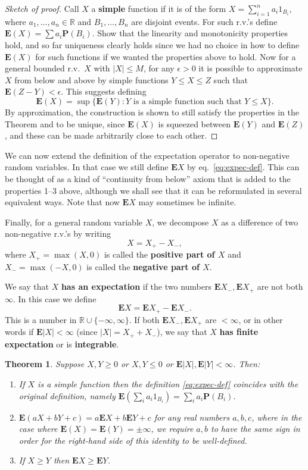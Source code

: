 \documentclass[12pt]{article}
\newtheorem{thm}{Theorem}[section]
\newcommand{\R}{\mathbb{R}}
\newcommand{\prob}{\mathbf{P}}
\newcommand{\expec}{\mathbf{E}}
\theoremstyle{example}
\begin{document}
\begin{proof}[Sketch of proof] Call $X$ a \textbf{simple} function if it is of the form $X=\sum_{i=1}^n a_i 1_{B_i}$, where $a_1,\ldots,a_n\in \R$ and $B_1,\ldots,B_n$ are disjoint events. For such r.v.'s define $\expec(X)=\sum a_i \prob(B_i)$. Show that the linearity and monotonicity properties hold, and so far uniqueness clearly holds since we had no choice in how to define $\expec(X)$ for such functions if we wanted the properties above to hold. Now for a general bounded r.v.\ $X$ with $|X|\le M$, for any $\epsilon>0$ it is possible to approximate $X$ from below and above by simple functions $Y \le X \le Z$ such that $\expec(Z-Y) < \epsilon$. This suggests defining
\begin{equation} \label{eq:expec-def}
\expec(X) = \sup \{ \expec(Y) : Y\textrm{ is a simple function such that }Y \le X \}.
\end{equation}
By approximation, the construction is shown to still satisfy the properties in the Theorem and to be unique, since $\expec(X)$ is squeezed between $\expec(Y)$ and $\expec(Z)$, and these can be made arbitrarily close to each other.
\end{proof}

We can now extend the definition of the expectation operator to non-negative random variables. In that case we still define $\expec X$ by eq.~\eqref{eq:expec-def}. This can be thought of as a kind of ``continuity from below'' axiom that is added to the properties 1--3 above, although we shall see that it can be reformulated in several equivalent ways. Note that now $\expec X$ may sometimes be infinite.

Finally, for a general random variable $X$, we decompose $X$ as a difference of two non-negative r.v.'s by writing
$$ X = X_+ - X_-, $$
where $X_+ = \max(X,0)$ is called the \textbf{positive part of $X$} and $X_-=\max(-X,0)$ is called the \textbf{negative part of $X$}.

We say that $X$ \textbf{has an expectation} if the two numbers $\expec X_-, \expec X_+$ are not both $\infty$. In this case we define
$$ \expec X = \expec X_+ - \expec X_-. $$
This is a number in $\R\cup\{ -\infty,\infty\}$. If both $\expec X_-, \expec X_+$ are $<\infty$, or in other words if $\expec |X|<\infty$ (since $|X|=X_+ + X_-$), we say that $X$ \textbf{has finite expectation} or is \textbf{integrable}.

\begin{thm} Suppose $X,Y\ge 0$ or $X,Y\le 0$ or $\expec |X|, \expec|Y|<\infty$. Then:
\begin{enumerate}
\item If $X$ is a simple function then the definition \eqref{eq:expec-def} coincides with the original definition, namely $\expec(\sum_i a_i 1_{B_i}) = \sum_i a_i \prob(B_i)$.
\item $\expec(aX+bY+c)=a\expec X + b\expec Y+c$ for any real numbers $a,b,c$, where in the case where $\expec(X)=\expec(Y) = \pm \infty$, we require $a,b$ to have the same sign in order for the right-hand side of this identity to be well-defined.
\item If $X\ge Y$ then $\expec X\ge \expec Y$.
\end{enumerate}
\end{thm}
\end{document}
